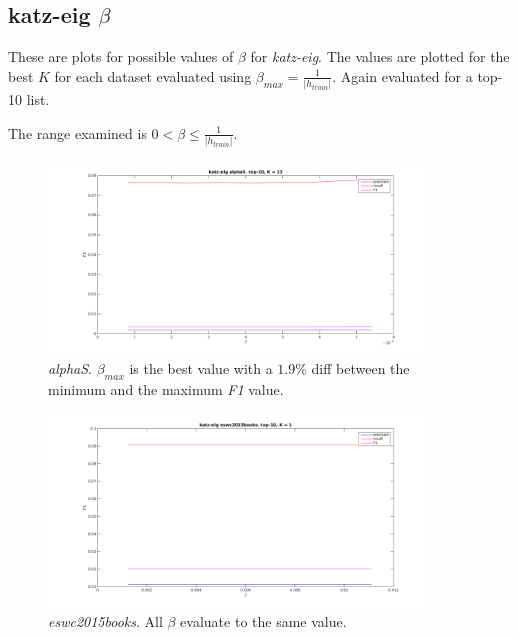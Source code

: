 \FloatBarrier


\subsection{katz-eig $\beta$}

These are plots for possible values of $\beta$ for \textit{katz-eig}. The values are plotted for the best $K$ for each dataset evaluated using $\beta_{max} = \frac{1}{|h_{train}|}$. Again evaluated for a top-10 list.

The range examined is $0 < \beta \leq \frac{1}{|h_{train}|}$.

\FloatBarrier

\begin{figure}[h!]
  \centering
    \includegraphics[width=0.9\textwidth]{fig/katzeig_beta/alphaS_katzeig_beta.png}
    \vspace{-20pt}
    \caption{\textit{alphaS}.
        $\beta_{max}$ is the best value with a $1.9\%$ diff between the minimum and the maximum \textit{F1} value.}
    \vspace{-10pt}
\end{figure}

\begin{figure}[h!]
  \centering
    \includegraphics[width=0.9\textwidth]{fig/katzeig_beta/eswc2015books_katzeig_beta.png}
    \vspace{-20pt}
    \caption{\textit{eswc2015books}. All $\beta$ evaluate to the same value.}
\end{figure}

